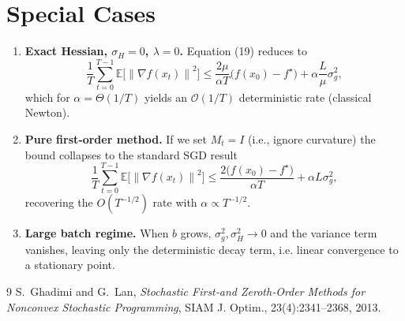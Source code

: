 \documentclass{article}
\newcommand{\E}{\mathbb{E}}
\newcommand{\norm}[1]{\left\|#1\right\|}
\begin{document}
\section*{Special Cases}
\begin{enumerate}
\item \textbf{Exact Hessian, $\sigma_{H}=0$, $\lambda=0$.}  
Equation (19) reduces to
\[
\frac{1}{T}\sum_{t=0}^{T-1}\E\!\big[\norm{\nabla f(x_{t})}^{2}\big]
\le
\frac{2\mu}{\alpha T}\big(f(x_{0})-f^{\star}\big)+\alpha\frac{L}{\mu}\sigma_{g}^{2},
\]
which for $\alpha=\Theta(1/T)$ yields an $\mathcal{O}(1/T)$ deterministic rate (classical Newton).

\item \textbf{Pure first‑order method.}  
If we set $M_{t}=I$ (i.e., ignore curvature) the bound collapses to the standard SGD result
\[
\frac{1}{T}\sum_{t=0}^{T-1}\E\!\big[\norm{\nabla f(x_{t})}^{2}\big]
\le
\frac{2\big(f(x_{0})-f^{\star}\big)}{\alpha T}
   +\alpha L\sigma_{g}^{2},
\]
recovering the $O(T^{-1/2})$ rate with $\alpha\propto T^{-1/2}$.

\item \textbf{Large batch regime.}  
When $b$ grows, $\sigma_{g}^{2},\sigma_{H}^{2}\to0$ and the variance term vanishes, leaving only the deterministic decay term, i.e. linear convergence to a stationary point.
\end{enumerate}

\begin{thebibliography}{9}
S.~Ghadimi and G.~Lan, \emph{Stochastic First‑and Zeroth‑Order Methods for Nonconvex Stochastic Programming}, SIAM J. Optim., 23(4):2341–2368, 2013.
\end{thebibliography}
\end{document}
